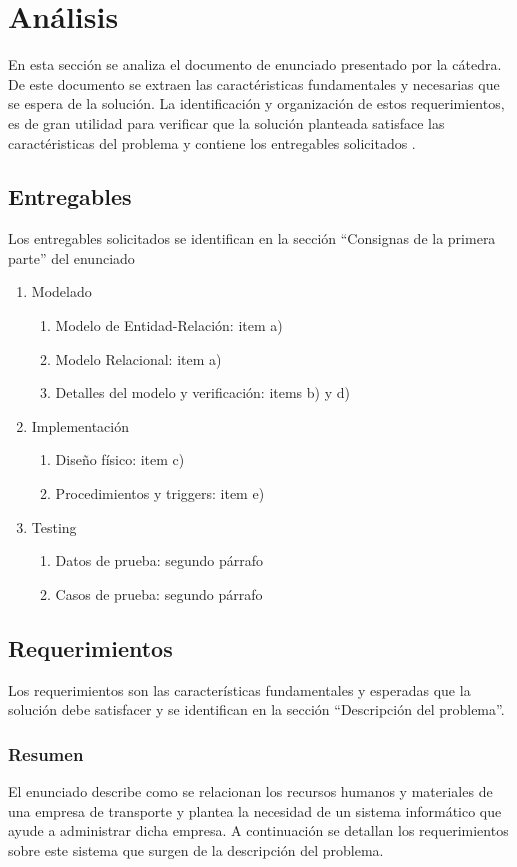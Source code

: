 \section{An\'alisis}
En esta secci\'on se analiza el documento de enunciado presentado por la c\'atedra.
De este documento se extraen las caract\'eristicas fundamentales y necesarias que se espera de la soluci\'on. 
La identificaci\'on y organizaci\'on de estos requerimientos, es de gran utilidad para verificar que la soluci\'on planteada
satisface las caract\'eristicas del problema y contiene los entregables solicitados .\\
\subsection{Entregables}
Los entregables solicitados se identifican en la secci\'on ``Consignas de la primera parte'' del enunciado
\begin{enumerate}
\item Modelado
  \begin{enumerate}[label=\roman{*}]
  \item Modelo de Entidad-Relaci\'on: item a)
  \item Modelo Relacional: item a)
  \item Detalles del modelo y verificaci\'on: items b) y d)
  \end{enumerate}
\item Implementaci\'on
  \begin{enumerate}[label=\roman{*}]
  \item Dise\~no f\'isico: item c)
  \item Procedimientos y triggers: item e)
  \end{enumerate}
\item Testing
  \begin{enumerate}[label=\roman{*}]
  \item Datos de prueba: segundo p\'arrafo
  \item Casos de prueba: segundo p\'arrafo
  \end{enumerate}
\end{enumerate}

\subsection{Requerimientos}
Los requerimientos son las caracter\'isticas fundamentales y esperadas que la soluci\'on debe satisfacer y se identifican en
la secci\'on ``Descripci\'on del problema''. 
\subsubsection{Resumen}
El enunciado describe como se relacionan los recursos humanos y materiales de una empresa de transporte y plantea 
la necesidad de un sistema inform\'atico que ayude a administrar dicha empresa. A continuaci\'on se detallan 
los requerimientos sobre este sistema que surgen de la descripci\'on del problema.
